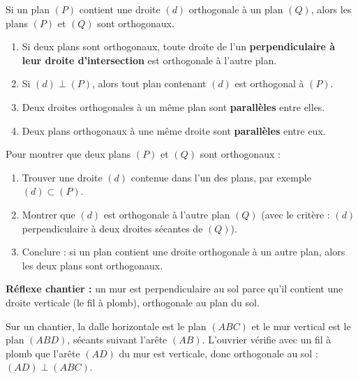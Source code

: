 \documentclass[11pt]{article}
\newcommand{\cle}[1]{{\popxbold\color{popdark}#1}}
\begin{document}
\begin{propriete}
Si un plan $(P)$ contient une droite $(d)$ orthogonale à un plan $(Q)$, alors les plans $(P)$ et $(Q)$ sont orthogonaux.
\end{propriete}

\begin{propriete}
\begin{enumerate}
\item Si deux plans sont orthogonaux, toute droite de l'un \textbf{perpendiculaire à leur droite d'intersection} est orthogonale à l'autre plan.
\item Si $(d) \perp (P)$, alors tout plan contenant $(d)$ est orthogonal à $(P)$.
\item Deux droites orthogonales à un même plan sont \textbf{parallèles} entre elles.
\item Deux plans orthogonaux à une même droite sont \textbf{parallèles} entre eux.
\end{enumerate}
\end{propriete}

\begin{methode}
Pour montrer que deux plans $(P)$ et $(Q)$ sont orthogonaux :
\begin{enumerate}
\item Trouver une droite $(d)$ contenue dans l'un des plans, par exemple $(d) \subset (P)$.
\item Montrer que $(d)$ est orthogonale à l'autre plan $(Q)$ (avec le critère : $(d)$ perpendiculaire à deux droites sécantes de $(Q)$).
\item Conclure : si un plan contient une droite orthogonale à un autre plan, alors les deux plans sont \cle{orthogonaux}.
\end{enumerate}
\textbf{Réflexe chantier :} un mur est perpendiculaire au sol parce qu'il contient une droite verticale (le fil à plomb), orthogonale au plan du sol.
\end{methode}

\begin{exemplebox}
Sur un chantier, la dalle horizontale est le plan $(ABC)$ et le mur vertical est le plan $(ABD)$, sécants suivant l'arête $(AB)$. L'ouvrier vérifie avec un fil à plomb que l'arête $(AD)$ du mur est verticale, donc orthogonale au sol : $(AD) \perp (ABC)$.
\end{exemplebox}
\end{document}
